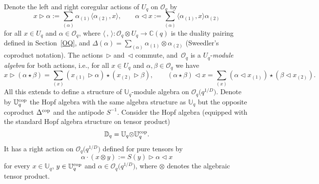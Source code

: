 \documentclass[pdftex]{sigma}%
\numberwithin{equation}{section}
\numberwithin{figure}{section}
\newcommand{\Oq}{\Oo_{q}}
\newcommand{\OqD}{\Oo_{q}\big(q^{1/D}\big)}
\newcommand{\mUq}{\mathbb{U}_q}
\newcommand{\mc}{\mathbb{C}}
\newcommand{\Oo}{{\mathcal O}}
\begin{document}
Denote the left and right coregular actions of $U_q$ on $\Oq$ by
\[
x\rhd \alpha := \sum_{(\alpha)}\alpha_{(1)} \langle \alpha_{(2)},x\rangle,\qquad \alpha \lhd x := \sum_{(\alpha)} \langle \alpha_{(1)},x\rangle \alpha_{(2)}
\]
for all $x\in U_q$ and $\alpha\in \Oq$, where $\langle\, ,\, \rangle\colon \Oq \otimes U_q \to \mc(q)$ is the duality pairing defined in Section~\ref{OQ}, and $\textstyle \Delta(\alpha) = \sum_{(\alpha)}\alpha_{(1)} \otimes \alpha_{(2)}$ (Sweedler's coproduct notation). The actions~$\rhd$ and~$\lhd$ commute, and~$\Oq$ is a $U_q$-{\it module algebra} for both actions, i.e., for all $x\in U_q$ and $\alpha,\beta\in \Oq$ we have
\[x\rhd (\alpha\star \beta)=\sum_{(x)}(x_{(1)}\rhd \alpha)\star(x_{(2)}\rhd \beta), \qquad (\alpha\star\beta)\lhd x=\sum_{(x)}(\alpha\lhd x_{(1)} )\star(\beta\lhd x_{(2)}).\]
All this extends to define a structure of $\mUq$-module algebra on $\OqD$. Denote by $\mUq^{\rm cop}$ the Hopf algebra with the same algebra structure as $\mUq$ but the opposite coproduct ${\Delta}^{\rm cop}$ and the antipode ${S}^{-1}$. Consider the Hopf algebra (equipped with the standard Hopf algebra structure on tensor product)
\[{\mathbb D}_q=\mUq {\otimes} \mUq^{\rm cop}.\]
It has a right action on $\OqD$ defined for pure tensors by
\begin{equation*}%
\alpha\cdot (x\otimes y) :={S}(y) \rhd \alpha \lhd x
\end{equation*}
for every $x\in \mUq$, $y\in \mUq^{\rm cop}$ and $\alpha\in \OqD$, where $\otimes$ denotes the algebraic tensor product.
\end{document}
